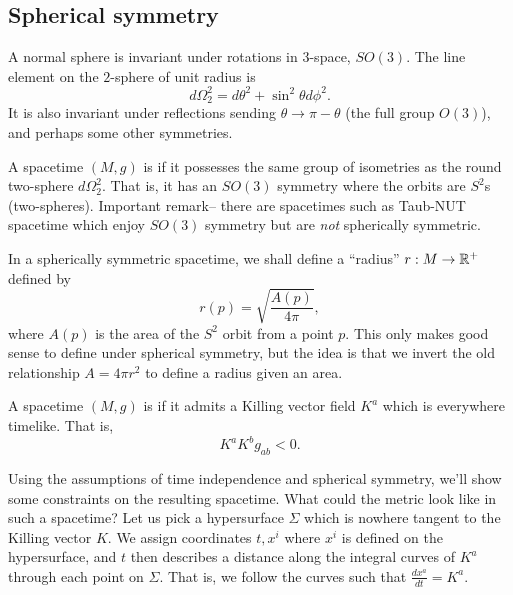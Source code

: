 \subsection*{Spherical symmetry} A normal sphere is invariant under rotations in $3$-space, $SO(3)$. The line element on the $2$-sphere of unit radius is
\begin{equation*}
    d\Omega_2^2 = d\theta^2 +\sin^2\theta d\phi^2.
\end{equation*}
It is also invariant under reflections sending $\theta\to \pi-\theta$ (the full group $O(3)$), and perhaps some other symmetries.

\begin{defn}
A spacetime $(M,g)$ is  if it possesses the same group of isometries as the round two-sphere $d\Omega_2^2$. That is, it has an $SO(3)$ symmetry where the orbits are $S^2$s (two-spheres). Important remark-- there are spacetimes such as Taub-NUT spacetime which enjoy $SO(3)$ symmetry but are \emph{not} spherically symmetric.
\end{defn}

In a spherically symmetric spacetime, we shall define a ``radius'' $r:M\to \mathbb{R}^+$ defined by 
\begin{equation*}
    r(p) =\sqrt{\frac{A(p)}{4\pi}},
\end{equation*}
where $A(p)$ is the area of the $S^2$ orbit from a point $p$. This only makes good sense to define under spherical symmetry, but the idea is that we invert the old relationship $A=4\pi r^2$ to define a radius given an area.

\begin{defn}
    A spacetime $(M,g)$ is  if it admits a Killing vector field $K^a$ which is everywhere timelike. That is,
    \begin{equation*}
        K^a K^b g_{ab} < 0.
    \end{equation*}
\end{defn}

Using the assumptions of time independence and spherical symmetry, we'll show some constraints on the resulting spacetime. What could the metric look like in such a spacetime? Let us pick a hypersurface $\Sigma$ which is nowhere tangent to the Killing vector $K$. We assign coordinates $t,x^i$ where $x^i$ is defined on the hypersurface, and $t$ then describes a distance along the integral curves of $K^a$ through each point on $\Sigma$. That is, we follow the curves such that $\frac{dx^a}{dt}=K^a$.


